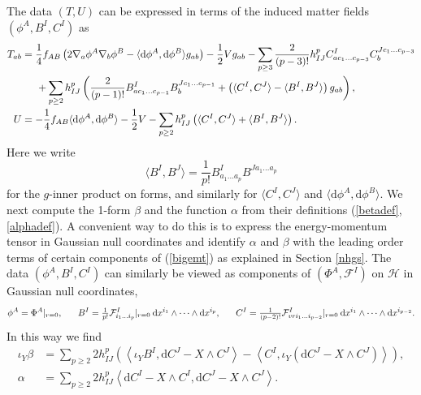 \documentclass[11pt, reqno]{amsart}
\theoremstyle{plain}
\theoremstyle{definition}
\numberwithin{equation}{section}
\begin{document}
The data $(T,U)$ can be expressed in terms of the induced matter fields $(\phi^A, B^I,C^I)$ as
\begin{subequations} \label{id}
\begin{align}
    T_{ab} &= \frac 14f_{AB}\left(2\nabla_a \phi^A\nabla_b\phi^B - \langle \text{d}\phi^A, \text{d}\phi^B\rangle g_{ab}\right) - \frac 12 Vg_{ab} - \sum_{p\geq 3} \frac{2}{(p-3)!}h_{IJ}^pC^I_{ac_1\dots c_{p-3}}C^{Jc_1\dots c_{p-3}}_b\nonumber\\ &\hspace{.5cm}+ \sum_{p\geq 2} h_{IJ}^p\left(\frac{2}{(p-1)!}B^{I}_{ac_1\dots c_{p-1}}B_b^{Jc_1\dots c_{p-1
    }} + \left(\langle C^I, C^J\rangle - \langle B^I, B^J\rangle\right) g_{ab}
    \right), \\
    U &= -\frac 14f_{AB}\langle\text{d}\phi^A, \text{d}\phi^B\rangle  - \frac 12 V - \sum_{p \geq 2} h_{IJ}^p\left( \langle C^I, C^J\rangle + \langle B^I, B^J\rangle \right).
\end{align}
\end{subequations}
Here we write 
\begin{equation*}
    \langle B^I, B^J\rangle = \frac{1}{p!}B^I_{a_1\dots a_{p}}B^{Ja_1\dots a_{p}}
\end{equation*}
for the $g$-inner product on forms, and similarly for $\langle C^I, C^J \rangle$ and $\langle \text{d}\phi^A, \text{d}\phi^B\rangle$. We next compute the 1-form $\beta$ and the function $\alpha$ from their definitions (\ref{betadef}, \ref{alphadef}). A convenient way to do this is to express the energy-momentum tensor in Gaussian null coordinates and identify $\alpha$ and $\beta$ with the leading order terms of certain components of (\ref{bigemt}) as explained in Section \ref{nhgs}. The data $(\phi^A,B^I,C^I)$ can similarly be viewed as components of $(\Phi^A, \mathcal{F}^I)$ on $\mathcal{H}$ in Gaussian null coordinates,
\begin{equation*}
    \phi^A = \Phi^A\vert_{r = 0}, \hspace{.6cm} B^I = \tfrac{1}{p!}\mathcal{F}^I_{i_1\dots i_p}\vert_{r = 0}\:\text{d}x^{i_1}\wedge\dots\wedge\text{d}x^{i_p}, \hspace{.6cm} C^I = \tfrac{1}{(p-2)!}\mathcal{F}^I_{vri_1\dots i_{p-2}}\vert_{r = 0}\:\text{d}x^{i_1}\wedge\dots\wedge \text{d}x^{i_{p-2}}.
\end{equation*}
In this way we find
\begin{subequations}
\begin{align}
    \iota_Y \beta &=  \sum_{p\geq2}2h^p_{IJ}\left(\left\langle \iota_Y B^I, \text{d}C^J - X \wedge C^J\right\rangle-\left\langle C^I, \iota_Y(\text{d}C^J - X \wedge C^J)\right\rangle \right), \label{betaex1} \\
    \alpha &= \sum_{p \geq 2} 2h_{IJ}^p\left\langle \text{d}C^I - X \wedge C^ I, \text{d}C^J - X \wedge C^ J\right\rangle. \label{alphaex1}
\end{align}
\end{subequations}
\end{document}
